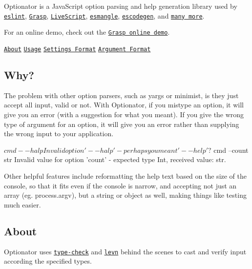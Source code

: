 \label{_optionator}%


Optionator is a Java\+Script option parsing and help generation library used by \href{http://eslint.org}{\tt eslint}, \href{http://graspjs.com}{\tt Grasp}, \href{http://livescript.net}{\tt Live\+Script}, \href{https://github.com/estools/esmangle}{\tt esmangle}, \href{https://github.com/estools/escodegen}{\tt escodegen}, and \href{https://www.npmjs.com/browse/depended/optionator}{\tt many more}.

For an online demo, check out the \href{http://www.graspjs.com/#demo}{\tt Grasp online demo}.

\href{#about}{\tt About} \textperiodcentered{} \href{#usage}{\tt Usage} \textperiodcentered{} \href{#settings-format}{\tt Settings Format} \textperiodcentered{} \href{#argument-format}{\tt Argument Format}

\subsection*{Why?}

The problem with other option parsers, such as {\ttfamily yargs} or {\ttfamily minimist}, is they just accept all input, valid or not. With Optionator, if you mistype an option, it will give you an error (with a suggestion for what you meant). If you give the wrong type of argument for an option, it will give you an error rather than supplying the wrong input to your application. \begin{DoxyVerb}$ cmd --halp
Invalid option '--halp' - perhaps you meant '--help'?

$ cmd --count str
Invalid value for option 'count' - expected type Int, received value: str.
\end{DoxyVerb}


Other helpful features include reformatting the help text based on the size of the console, so that it fits even if the console is narrow, and accepting not just an array (eg. process.\+argv), but a string or object as well, making things like testing much easier.

\subsection*{About}

Optionator uses \href{https://github.com/gkz/type-check}{\tt type-\/check} and \href{https://github.com/gkz/levn}{\tt levn} behind the scenes to cast and verify input according the specified types.

